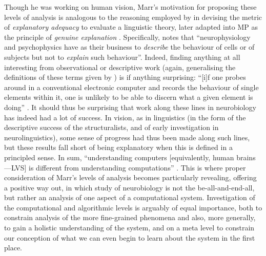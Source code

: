Though he was working on human vision, Marr's motivation for proposing these levels of analysis is analogous to the reasoning employed by \textcite{ChomskyN_1964,ChomskyN_1965} in devising the metric of \textit{explanatory adequacy} to evaluate a linguistic theory, later adapted into MP as the principle of \textit{genuine explanation} \parencite{ChomskyN_1993,ChomskyN_1995}. Specifically, \textcite[15]{MarrD_1982} notes that ``neurophysiology and psychophysics have as their business to \textit{describe} the behaviour of cells or of subjects but not to \textit{explain} such behaviour''. Indeed, finding anything at all interesting from observational or descriptive work (again, generalising the definitions of these terms given by ) is if anything surprising: ``[i]f one probes around in a conventional electronic computer and records the behaviour of single elements within it, one is unlikely to be able to discern what a given element is doing'' \parencite[14]{MarrD_1982}. It should thus be surprising that work along these lines in neurobiology has indeed had a lot of success. In vision, as in linguistics (in the form of the descriptive success of the structuralists, and of early investigation in neurolinguistics), some sense of progress had thus been made along such lines, but these results fall short of being explanatory when this is defined in a principled sense. In sum, ``understanding computers [equivalently, human brains---LVS] is different from understanding computations'' \parencite[5]{MarrD_1982}. This is where proper consideration of Marr's levels of analysis becomes particularly revealing, offering a positive way out, in which study of neurobiology is not the be-all-and-end-all, but rather an analysis of one aspect of a computational system. Investigation of the computational and algorithmic levels is arguably of equal importance, both to constrain analysis of the more fine-grained phenomena and also, more generally, to gain a holistic understanding of the system, and on a meta level to constrain our conception of what we can even begin to learn about the system in the first place.

